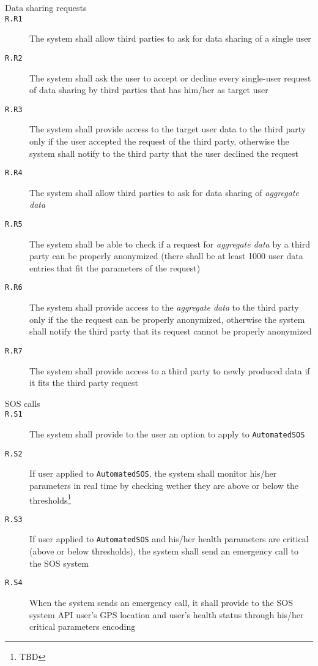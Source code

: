 \begin{description}
      \item[Data sharing requests]
      \item[\texttt{R.R1}] The system shall allow third parties to ask for data sharing of a single user
      \item[\texttt{R.R2}] The system shall ask the user to accept or decline every single-user request of data sharing by third parties that has him/her as target user
      \item[\texttt{R.R3}] The system shall provide access to the target user data to the third party only if the user accepted the request of the third party, otherwise the system shall notify to the third party that the user declined the request
      \item[\texttt{R.R4}] The system shall allow third parties to ask for data sharing of \textit{aggregate data}
      \item[\texttt{R.R5}] The system shall be able to check if a request for \textit{aggregate data} by a third party can be properly anonymized (there shall be at least 1000 user data entries that fit the parameters of the request)
      \item[\texttt{R.R6}] The system shall provide access to the \textit{aggregate data} to the third party only if the the request can be properly anonymized, otherwise the system shall notify the third party that its request cannot be properly anonymized
      \item[\texttt{R.R7}] The system shall provide access to a third party to newly produced data if it fits the third party request

      \item[SOS calls]
      \item[\texttt{R.S1}] The system shall provide to the user an option to apply to \texttt{AutomatedSOS}
      \item[\texttt{R.S2}] If user applied to \texttt{AutomatedSOS}, the system shall monitor his/her parameters in real time by checking wether they are above or below the thresholds\footnote{TBD
      }
      \item[\texttt{R.S3}] If user applied to \texttt{AutomatedSOS} and his/her health parameters are critical (above or below thresholds), the system shall send an emergency call to the SOS system
      \item[\texttt{R.S4}] When the system sends an emergency call, it shall provide to the SOS system API user's GPS location and user's health status through his/her critical parameters encoding

    \end{description}

